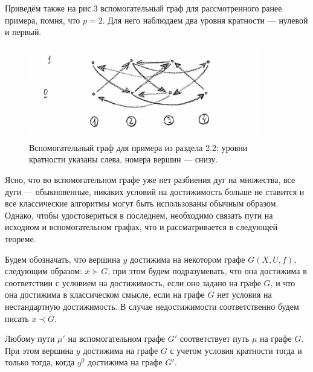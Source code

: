 Приведём также на рис.3 вспомогательный граф для рассмотренного ранее примера, помня, что $p = 2$. Для него наблюдаем два уровня кратности --- нулевой и первый.

\begin{figure}
	\centering
	{\includegraphics[width=0.9\textwidth]{img/3.png}}
	{Вспомогательный граф для примера из раздела 2.2; уровни кратности указаны слева, номера вершин --- снизу.}
	\label{fig:pic_3}
\end{figure}

Ясно, что во вспомогательном графе уже нет разбиения дуг на множества, все дуги --- обыкновенные, никаких условий на достижимость больше не ставится и все классические алгоритмы могут быть использованы обычным образом. Однако, чтобы удостовериться в последнем, необходимо связать пути на исходном и вспомогательном графах, что и рассматривается в следующей теореме. 

\begin{definition}
	Будем обозначать, что вершина $y$ достижима на некотором графе $G(X,U,f)$, следующим образом: $x \succ G$, при этом будем подразумевать, что она достижима в соответствии с условием на достижимость, если оно задано на графе $G$, и что она достижима в классическом смысле, если на графе $G$ нет условия на нестандартную достижимость.
	В случае недостижимости соответственно будем писать $x \prec G$.
\end{definition}

\begin{theorem}
	Любому пути $\mu'$ на вспомогательном графе $G'$ соответствует путь $\mu$ на графе $G$. При этом вершина $y$ достижима на графе $G$ с учетом условия кратности тогда и только тогда, когда $y^0$ достижима на графе $G'$. 
\end{theorem}

